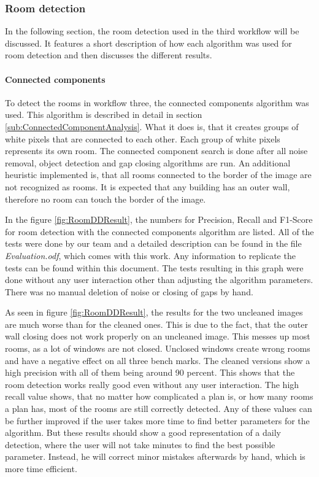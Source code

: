 \subsubsection{Room detection}
\label{sub:RoomDetection}
In the following section, the room detection used in the third workflow will be discussed. It features a short description of how each algorithm was used for room detection and then discusses the different results.
\paragraph{Connected components}
\label{sec:ConnectedComponents}
To detect the rooms in workflow three, the connected components algorithm was used. This algorithm is described in detail in section \ref{sub:ConnectedComponentAnalysis}. What it does is, that it creates groups of white pixels that are connected to each other. Each group of white pixels represents its own room. The connected component search is done after all noise removal, object detection and gap closing algorithms are run. An additional heuristic implemented is, that all rooms connected to the border of the image are not recognized as rooms. It is expected that any building has an outer wall, therefore no room can touch the border of the image.

In the figure \ref{fig:RoomDDResult}, the numbers for Precision, Recall and F1-Score for room detection with the connected components algorithm are listed. All of the tests were done by our team and a detailed description can be found in the file \textit{Evaluation.odf}, which comes with this work. Any information to replicate the tests can be found within this document. The tests resulting in this graph were done without any user interaction other than adjusting the algorithm parameters. There was no manual deletion of noise or closing of gaps by hand.

As seen in figure \ref{fig:RoomDDResult}, the results for the two uncleaned images are much worse than for the cleaned ones. This is due to the fact, that the outer wall closing does not work properly on an uncleaned image. This messes up most rooms, as a lot of windows are not closed. Unclosed windows create wrong rooms and have a negative effect on all three bench marks. The cleaned versions show a high precision with all of them being around 90 percent. This shows that the room detection works really good even without any user interaction. The high recall value shows, that no matter how complicated a plan is, or how many rooms a plan has, most of the rooms are still correctly detected. Any of these values can be further improved if the user takes more time to find better parameters for the algorithm. But these results should show a good representation of a daily detection, where the user will not take minutes to find the best possible parameter. Instead, he will correct minor mistakes afterwards by hand, which is more time efficient.

